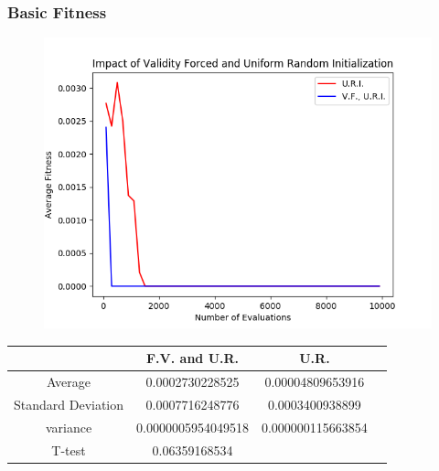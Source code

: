 \documentclass{article}
\begin{document}
		\subsubsection{Basic Fitness}
		\begin{figure}[!htb]
		\centering
		\includegraphics[scale=0.4]{q2_random_board_basic_ur_vs_vfur.png}
		\end{figure}
		\begin{center}
		\begin{tabular}{ || c | c | c | c ||}
		\hline
		       & F.V. and U.R. & U.R.\\ 
		 \hline\hline
		 Average & 0.0002730228525 &	0.00004809653916 \\ 
		 \hline
		 Standard Deviation &	0.0007716248776 &	0.0003400938899\\
		 \hline
		 variance &	0.0000005954049518 &	0.000000115663854 \\
		 \hline
		 T-test &	0.06359168534	& \\
		 \hline
		\end{tabular}
		\end{center}
\clearpage
		
\end{document}
